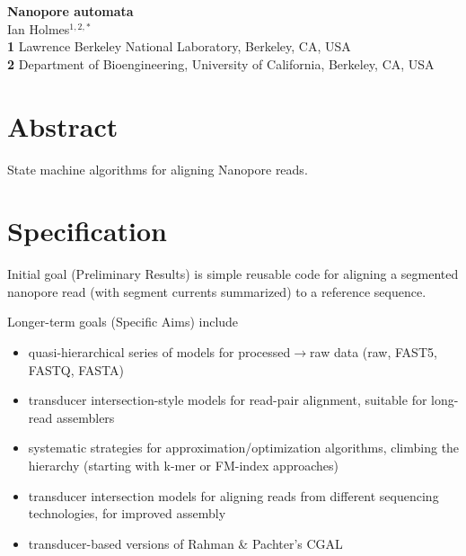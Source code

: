 \documentclass[10pt]{article}
\date{}
\newcommand\titlestring{Nanopore automata}
\newcommand\authorstring{
Ian Holmes$^{1,2,\ast}$
\\
\textbf{1} Lawrence Berkeley National Laboratory, Berkeley, CA, USA
\\
\textbf{2} Department of Bioengineering, University of California, Berkeley, CA, USA
}
\begin{document}
\begin{flushleft}
  {\Large
    \textbf{\titlestring}
  }
\\
\authorstring
\end{flushleft}


\tableofcontents


\section{Abstract}
State machine algorithms for aligning Nanopore reads.




\section{Specification}

Initial goal (Preliminary Results) is simple reusable code for aligning a segmented nanopore read (with segment currents summarized) to a reference sequence.

Longer-term goals (Specific Aims) include
\begin{itemize}
\item quasi-hierarchical series of models for processed$\to$raw data (raw, FAST5, FASTQ, FASTA)
\item transducer intersection-style models for read-pair alignment, suitable for long-read assemblers
\item systematic strategies for approximation/optimization algorithms, climbing the hierarchy (starting with k-mer or FM-index approaches)
\item transducer intersection models for aligning reads from different sequencing technologies, for improved assembly
\item transducer-based versions of Rahman \& Pachter's CGAL
\end{itemize}
\end{document}
